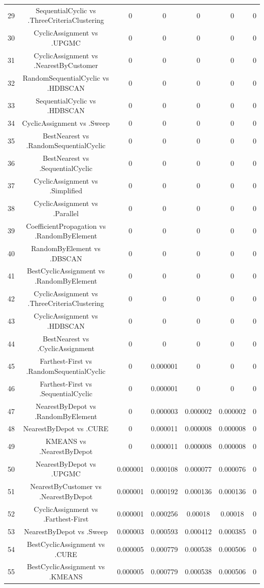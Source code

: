 \documentclass[a4paper,10pt]{article}
\begin{document}
\begin{landscape}
\begin{table}[!htp]
\begin{tabular}{ccccccc}
29&SequentialCyclic vs .ThreeCriteriaClustering&0&0&0&0&0\\
30&CyclicAssignment vs .UPGMC&0&0&0&0&0\\
31&CyclicAssignment vs .NearestByCustomer&0&0&0&0&0\\
32&RandomSequentialCyclic vs .HDBSCAN&0&0&0&0&0\\
33&SequentialCyclic vs .HDBSCAN&0&0&0&0&0\\
34&CyclicAssignment vs .Sweep&0&0&0&0&0\\
35&BestNearest vs .RandomSequentialCyclic&0&0&0&0&0\\
36&BestNearest vs .SequentialCyclic&0&0&0&0&0\\
37&CyclicAssignment vs .Simplified&0&0&0&0&0\\
38&CyclicAssignment vs .Parallel&0&0&0&0&0\\
39&CoefficientPropagation vs .RandomByElement&0&0&0&0&0\\
40&RandomByElement vs .DBSCAN&0&0&0&0&0\\
41&BestCyclicAssignment vs .RandomByElement&0&0&0&0&0\\
42&CyclicAssignment vs .ThreeCriteriaClustering&0&0&0&0&0\\
43&CyclicAssignment vs .HDBSCAN&0&0&0&0&0\\
44&BestNearest vs .CyclicAssignment&0&0&0&0&0\\
45&Farthest-First vs .RandomSequentialCyclic&0&0.000001&0&0&0\\
46&Farthest-First vs .SequentialCyclic&0&0.000001&0&0&0\\
47&NearestByDepot vs .RandomByElement&0&0.000003&0.000002&0.000002&0\\
48&NearestByDepot vs .CURE&0&0.000011&0.000008&0.000008&0\\
49&KMEANS vs .NearestByDepot&0&0.000011&0.000008&0.000008&0\\
50&NearestByDepot vs .UPGMC&0.000001&0.000108&0.000077&0.000076&0\\
51&NearestByCustomer vs .NearestByDepot&0.000001&0.000192&0.000136&0.000136&0\\
52&CyclicAssignment vs .Farthest-First&0.000001&0.000256&0.00018&0.00018&0\\
53&NearestByDepot vs .Sweep&0.000003&0.000593&0.000412&0.000385&0\\
54&BestCyclicAssignment vs .CURE&0.000005&0.000779&0.000538&0.000506&0\\
55&BestCyclicAssignment vs .KMEANS&0.000005&0.000779&0.000538&0.000506&0\\

\end{tabular}
\end{table}
\end{landscape}
\end{document}
